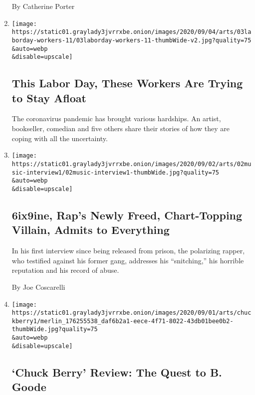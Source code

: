 \begin{enumerate}
  By Catherine Porter
\item
  \href{/2020/09/04/arts/labor-day-workers-arts-coronavirus.html}{}

  \texttt{[image: https://static01.graylady3jvrrxbe.onion/images/2020/09/04/arts/03laborday-workers-11/03laborday-workers-11-thumbWide-v2.jpg?quality=75\\\&auto=webp\\\&disable=upscale]}

  \hypertarget{this-labor-day-these-workers-are-trying-to-stay-afloat}{%
  \subsection{This Labor Day, These Workers Are Trying to Stay
  Afloat}\label{this-labor-day-these-workers-are-trying-to-stay-afloat}}

  The coronavirus pandemic has brought various hardships. An artist,
  bookseller, comedian and five others share their stories of how they
  are coping with all the uncertainty.
\item
  \href{/2020/09/02/arts/music/6ix9ine-interview.html}{}

  \texttt{[image: https://static01.graylady3jvrrxbe.onion/images/2020/09/02/arts/02music-interview1/02music-interview1-thumbWide.jpg?quality=75\\\&auto=webp\\\&disable=upscale]}

  \hypertarget{6ix9ine-raps-newly-freed-chart-topping-villain-admits-to-everything}{%
  \subsection{6ix9ine, Rap's Newly Freed, Chart-Topping Villain, Admits
  to
  Everything}\label{6ix9ine-raps-newly-freed-chart-topping-villain-admits-to-everything}}

  In his first interview since being released from prison, the
  polarizing rapper, who testified against his former gang, addresses
  his ``snitching,'' his horrible reputation and his record of abuse.

  By Joe Coscarelli
\item
  \href{/2020/09/02/movies/chuck-berry-review.html}{}

  \texttt{[image: https://static01.graylady3jvrrxbe.onion/images/2020/09/01/arts/chuckberry1/merlin\_176255538\_daf6b2a1-eece-4f71-8022-43db01bee0b2-thumbWide.jpg?quality=75\\\&auto=webp\\\&disable=upscale]}

  \hypertarget{chuck-berry-review-the-quest-to-b-goode}{%
  \subsection{`Chuck Berry' Review: The Quest to B.
  Goode}\label{chuck-berry-review-the-quest-to-b-goode}}


\end{enumerate}
